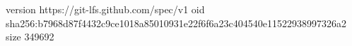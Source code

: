 version https://git-lfs.github.com/spec/v1
oid sha256:b7968d87f4432c9ce1018a85010931e22f6f6a23c404540e11522938997326a2
size 349692
